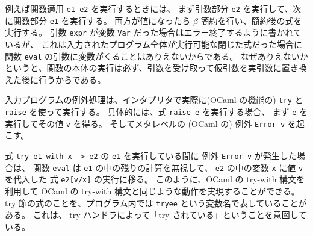 例えば関数適用 \texttt{e1 e2} を実行するときには、
まず引数部分 \texttt{e2} を実行して、次に関数部分 \texttt{e1} を実行する。
両方が値になったら $\beta$ 簡約を行い、簡約後の式を実行する。
引数 \texttt{expr} が変数 \texttt{Var} だった場合はエラー終了するように書かれているが、
これは入力されたプログラム全体が実行可能な閉じた式だった場合に
関数 \texttt{eval} の引数に変数がくることはありえないからである。
なぜありえないかというと、関数の本体の実行は必ず、引数を受け取って仮引数を実引数に置き換えた後に行うからである。

入力プログラムの例外処理は、インタプリタで実際に(OCaml の機能の) \texttt{try} と \texttt{raise} を使って実行する。
具体的には、式 \texttt{raise e} を実行する場合、
まず \texttt{e} を実行してその値 \texttt{v} を得る。
そしてメタレベルの (OCaml の) 例外 \texttt{Error v} を起こす。

式 \texttt{try e1 with x -> e2} の \texttt{e1} を実行している間に
例外 \texttt{Error v} が発生した場合は、
関数 \texttt{eval} は \texttt{e1} の中の残りの計算を無視して、
\texttt{e2} の中の変数 \texttt{x} に値 \texttt{v} を代入した
式 \texttt{e2[v/x]} の実行に移る。
このように、OCaml の try-with 構文を利用して OCaml の try-with 構文と同じような動作を実現することができる。
try 節の式のことを、プログラム内では \texttt{tryee} という変数名で表していることがある。
これは、 try ハンドラによって「try されている」ということを意図している。

